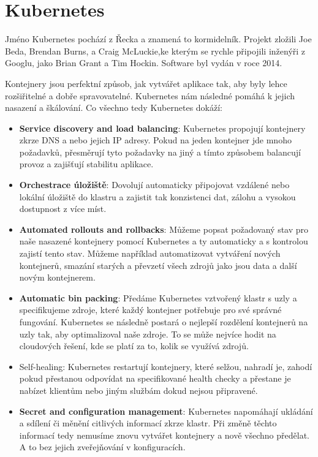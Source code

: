 
\section{Kubernetes}

Jméno Kubernetes pochází z Řecka a znamená to kormidelník. Projekt zložili Joe Beda, Brendan Burns, a Craig McLuckie,ke kterým se rychle připojili inženýři z Googlu, jako Brian Grant a Tim Hockin. Software byl vydán v roce 2014.

Kontejnery jsou perfektní způsob, jak vytvářet aplikace tak, aby byly lehce rozšiřitelné a dobře spravovatelné. Kubernetes nám následné pomáhá k jejich nasazení a škálování. Co všechno tedy Kubernetes dokáží:


\begin{itemize}
  	\item \textbf{Service discovery and load balancing}: Kubernetes propojují kontejnery zkrze DNS a nebo jejich IP adresy. Pokud na jeden 	kontejner jde mnoho požadavků, přesměrují tyto požadavky na jiný a tímto způsobem balancují provoz a zajišťují stabilitu aplikace.
	\item \textbf{Orchestrace úložiště}: Dovolují automaticky připojovat vzdálené nebo lokální úložiště do klastru a zajistit tak konzistenci dat, zálohu a vysokou dostupnost z více míst.
  	\item \textbf{Automated rollouts and rollbacks}: Můžeme popsat požadovaný stav pro naše nasazené kontejnery pomocí Kubernetes a ty automaticky a s kontrolou zajistí tento stav. Můžeme například automatizovat vytváření nových kontejnerů, smazání starých a převzetí všech zdrojů jako jsou data a další novým kontejnerem.
	\item \textbf{Automatic bin packing}: Předáme Kubernetes vztvořený klastr s uzly a specifikujeme zdroje, které každý kontejner potřebuje pro své správné fungování. Kubernetes se následně postará o nejlepší rozdělení kontejnerů na uzly tak, aby optimalizoval naše zdroje. To se může nejvíce hodit na cloudových řešení, kde se platí za to, kolik se využívá zdrojů. 
   	\item{Self-healing}:	Kubernetes restartují kontejnery, které selžou, nahradí je, zahodí pokud přestanou odpovídat na specifikované health checky a přestane je nabízet klientům nebo jiným službám dokud nejsou připravené. 
	\item \textbf{Secret and configuration management}: Kubernetes napomáhají ukládání a sdílení či měnění citlivých informací zkrze klastr. Při změně těchto informací tedy nemusíme znovu vytvářet kontejnery a nově všechno předělat. A to bez jejich zveřejňování v konfiguracích. 

\end{itemize}

